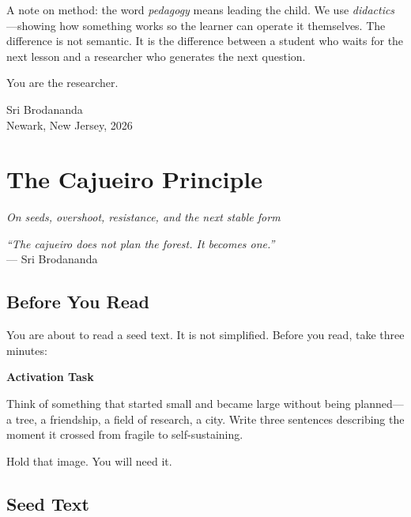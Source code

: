 \documentclass[11pt, twoside, openright]{book}
\theoremstyle{plain}
\theoremstyle{definition}
\newenvironment{activationbox}{%
  \begin{mdframed}[backgroundcolor=AlertBox,linecolor=orange!70,linewidth=0.5pt,innertopmargin=6pt,innerbottommargin=6pt]
  \noindent\textbf{Activation Task}\par\medskip}{\end{mdframed}}
\begin{document}
A note on method: the word \textit{pedagogy} means leading the child.
We use \textit{didactics}---showing how something works so the learner
can operate it themselves. The difference is not semantic. It is the
difference between a student who waits for the next lesson and a
researcher who generates the next question.

\medskip
\noindent You are the researcher.

\begin{flushright}
Sri Brodananda\\
Newark, New Jersey, 2026
\end{flushright}

\cleardoublepage

\chapter{The Cajueiro Principle}
\textit{On seeds, overshoot, resistance, and the next stable form}

\begin{flushright}
\textit{``The cajueiro does not plan the forest. It becomes one.''}\\
--- Sri Brodananda
\end{flushright}

\section{Before You Read}
You are about to read a seed text. It is not simplified.
Before you read, take three minutes:

\begin{activationbox}
Think of something that started small and became large without
being planned---a tree, a friendship, a field of research, a city.
Write three sentences describing the moment it crossed from fragile
to self-sustaining.
\end{activationbox}

Hold that image. You will need it.

\section{Seed Text}
\end{document}
